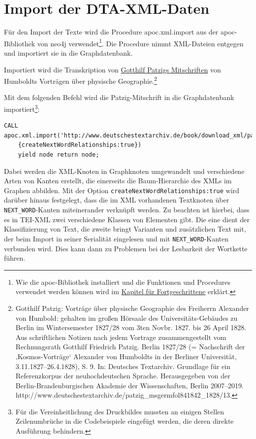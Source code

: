 \documentclass[ngerman,]{scrreprt}
\begin{document}
\section{Import der DTA-XML-Daten}\label{import-der-dta-xml-daten}

Für den Import der Texte wird die Procedure apoc.xml.import aus der apoc-Bibliothek von neo4j verwendet\footnote{Wie die apoc-Bibliothek installiert und die Funktionen und Procedures verwendet werden können wird im \href{85-cypher-fuer-Fortgeschrittene.md}{Kapitel für Fortgeschrittene} erklärt.}. Die Procedure nimmt XML-Dateien entgegen und importiert sie in die Graphdatenbank.

Importiert wird die Transkription von \href{http://www.deutschestextarchiv.de/patzig_msgermfol841842_1828/13}{Gotthilf Patzigs Mitschriften} von Humboldts Vorträgen über physische Geographie.\footnote{Gotthilf Patzig: Vorträge über physische Geographie des Freiherrn Alexander von Humbold: gehalten im großen Hörsaale des Universitäts-Gebäudes zu Berlin im Wintersemester 1827/28 vom 3ten Novbr. 1827. bis 26 April 1828. Aus schriftlichen Notizen nach jedem Vortrage zusammengestellt vom Rechnungsrath Gotthilf Friedrich Patzig. Berlin 1827/28 (= Nachschrift der ‚Kosmos-Vorträge` Alexander von Humboldts in der Berliner Universität, 3.11.1827--26.4.1828), S. 9. In: Deutsches Textarchiv. Grundlage für ein Referenzkorpus der neuhochdeutschen Sprache. Herausgegeben von der Berlin-Brandenburgischen Akademie der Wissenschaften, Berlin 2007--2019. http://www.deutschestextarchiv.de/patzig\_msgermfol841842\_1828/13.}

Mit dem folgenden Befehl wird die Patzig-Mitschrift in die Graphdatenbank importiert\footnote{Für die Vereinheitlichung des Druckbildes mussten an einigen Stellen Zeilenumbrüche in die Codebeispiele eingefügt werden, die deren direkte Ausführung behindern.}:

\begin{verbatim}
CALL apoc.xml.import('http://www.deutschestextarchiv.de/book/download_xml/patzig_msgermfol841842_1828',
    {createNextWordRelationships:true})     
    yield node return node;
\end{verbatim}

Dabei werden die XML-Knoten in Graphknoten umgewandelt und verschiedene Arten von Kanten erstellt, die einerseits die Baum-Hierarchie des XMLs im Graphen abbilden. Mit der Option \texttt{createNextWordRelationships:true} wird darüber hinaus festgelegt, dass die im XML vorhandenen Textknoten über \texttt{NEXT\_WORD}-Kanten miteinerander verknüpft werden. Zu beachten ist hierbei, dass es in TEI-XML zwei verschiedene Klassen von Elementen gibt. Die eine dient der Klassifizierung von Text, die zweite bringt Varianten und zusätzlichen Text mit, der beim Import in seiner Serialität eingelesen und mit \texttt{NEXT\_WORD}-Kanten verbunden wird. Dies kann dann zu Problemen bei der Lesbarkeit der Wortkette führen.
\end{document}
